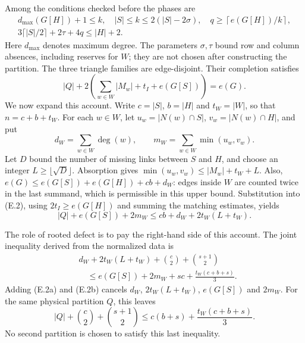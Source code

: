 \documentclass[english,11pt,a4paper]{article}
\begin{document}
Among the conditions checked before the phases are \[
\begin{gathered}
d_{\max}(G[H])+1\le k,\quad |S|\le k\le2(|S|-2\sigma),\quad
q\ge\left\lceil e(G[H])/k\right\rceil,\\
3\lceil|S|/2\rceil+2\tau+4q\le |H|+2.
\end{gathered}
\tag{E.1}
\] Here \(d_{\max}\) denotes maximum degree. The parameters \(\sigma,\tau\) bound row and column absences, including reserves for \(W\); they are not chosen after constructing the partition. The three triangle families are edge-disjoint. Their completion satisfies \[
|Q|+2\left(\sum_{w\in W}|M_w|+t_I+e(G[S])\right)=e(G).
\tag{E.2}
\] We now expand this account. Write \(c=|S|\), \(b=|H|\) and \(t_W=|W|\), so that \(n=c+b+t_W\). For each \(w\in W\), let \(u_w=|N(w)\cap S|\), \(v_w=|N(w)\cap H|\), and put \[
d_W=\sum_{w\in W}\deg(w),\qquad
m_W=\sum_{w\in W}\min(u_w,v_w).
\] Let \(D\) bound the number of missing links between \(S\) and \(H\), and choose an integer \(L\ge\lfloor\sqrt D\rfloor\). Absorption gives \(\min(u_w,v_w)\le |M_w|+t_W+L\). Also, \(e(G)\le e(G[S])+e(G[H])+cb+d_W\): edges inside \(W\) are counted twice in the last summand, which is permissible in this upper bound. Substitution into (E.2), using \(2t_I\ge e(G[H])\) and summing the matching estimates, yields \[
|Q|+e(G[S])+2m_W\le cb+d_W+2t_W(L+t_W).
\tag{E.2a}
\]

The role of rooted defect is to pay the right-hand side of this account. The joint inequality derived from the normalized data is \[
\begin{split}
&d_W+2t_W(L+t_W)+\binom c2+\binom{s+1}2\\
&\hspace{1em}\le e(G[S])+2m_W+sc+\frac{t_W(c+b+s)}3.
\end{split}
\tag{E.2b}
\] Adding (E.2a) and (E.2b) cancels \(d_W\), \(2t_W(L+t_W)\), \(e(G[S])\) and \(2m_W\). For the same physical partition \(Q\), this leaves \[
|Q|+\binom c2+\binom{s+1}2
\le c(b+s)+\frac{t_W(c+b+s)}3.
\tag{E.2c}
\] No second partition is chosen to satisfy this last inequality.
\end{document}
